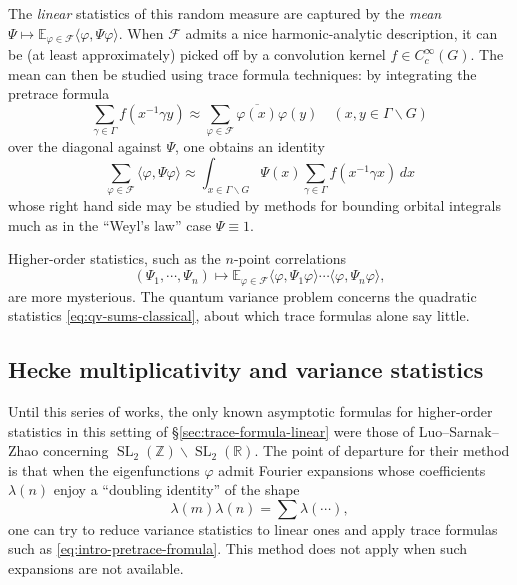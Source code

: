 \documentclass[reqno,10pt]{amsart}
\theoremstyle{plain} %
\theoremstyle{definition}
\theoremstyle{plain} %
\theoremstyle{remark}
\theoremstyle{itplain} %
\theoremstyle{remark} %
\numberwithin{equation}{section}
\DeclareMathOperator{\SL}{SL}
\begin{document}
The \emph{linear} statistics of this random measure are captured by the \emph{mean}
$\Psi \mapsto \mathbb{E}_{\varphi \in \mathcal{F}} \langle \varphi, \Psi \varphi \rangle$.
When $\mathcal{F}$ admits a nice harmonic-analytic description, it can be (at least approximately) picked off by a convolution kernel $f \in C_c^\infty(G)$.  The mean can then be studied using trace formula techniques: by integrating the pretrace formula
\begin{equation}\label{eq:intro-pretrace-fromula}
  \sum_{\gamma \in \Gamma} f(x^{-1} \gamma y)
  \approx
  \sum_{\varphi \in \mathcal{F} }
  \overline{\varphi(x)} \varphi(y) \quad (x,y \in \Gamma \backslash G)
\end{equation}
over the diagonal against $\Psi$, one obtains an identity
\begin{equation}\label{eq:intro-pretrace-fromula-1}
  \sum_{\varphi \in \mathcal{F} }
  \langle \varphi, \Psi \varphi  \rangle
  \approx
  \int_{x \in \Gamma \backslash G}
  \Psi(x) \sum_{\gamma \in \Gamma} f(x^{-1} \gamma x) \,d x 
\end{equation}
whose right hand side may be studied by methods for bounding orbital integrals much as in the ``Weyl's law'' case $\Psi \equiv 1$.

Higher-order statistics, such as the $n$-point correlations
\[
  (\Psi_1,\dotsb,\Psi_n) \mapsto \mathbb{E}_{\varphi \in \mathcal{F}} \langle \varphi, \Psi_1 \varphi \rangle \dotsb \langle \varphi, \Psi_n \varphi \rangle,
\]
are more mysterious.  The quantum variance problem concerns the quadratic statistics \eqref{eq:qv-sums-classical}, about which trace formulas alone say little.

\subsection{Hecke multiplicativity and variance statistics}\label{sec:35ac3e567f}
Until this series of works, the only known asymptotic formulas for higher-order statistics in this setting of \S\ref{sec:trace-formula-linear} were those of Luo--Sarnak--Zhao concerning $\SL_2(\mathbb{Z}) \backslash \SL_2(\mathbb{R})$.  The point of departure for their method is that when the eigenfunctions $\varphi$ admit Fourier expansions whose coefficients $\lambda(n)$ enjoy a ``doubling identity'' of the shape
\begin{equation}\label{eqn:hecke-multiplicativity}
  \lambda(m) \lambda(n) = \sum \lambda(\dotsb),
\end{equation}
one can try to reduce variance statistics to linear ones and apply trace formulas such as \eqref{eq:intro-pretrace-fromula}.  This method does not apply when such expansions are not available.
\end{document}
